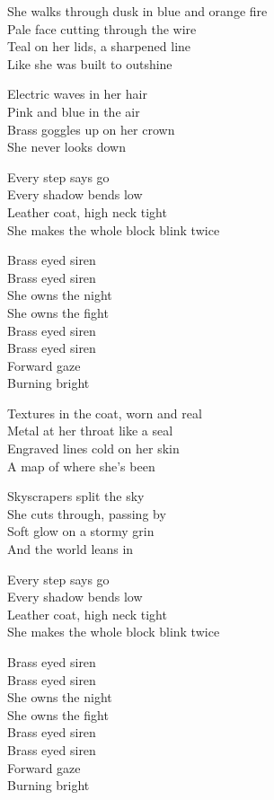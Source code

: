 \begin{lyrics}
She walks through dusk in blue and orange fire\\
Pale face cutting through the wire\\
Teal on her lids, a sharpened line\\
Like she was built to outshine

Electric waves in her hair\\
Pink and blue in the air\\
Brass goggles up on her crown\\
She never looks down

Every step says go\\
Every shadow bends low\\
Leather coat, high neck tight\\
She makes the whole block blink twice

Brass eyed siren\\
Brass eyed siren\\
She owns the night\\
She owns the fight\\
Brass eyed siren\\
Brass eyed siren\\
Forward gaze\\
Burning bright

Textures in the coat, worn and real\\
Metal at her throat like a seal\\
Engraved lines cold on her skin\\
A map of where she's been

Skyscrapers split the sky\\
She cuts through, passing by\\
Soft glow on a stormy grin\\
And the world leans in

Every step says go\\
Every shadow bends low\\
Leather coat, high neck tight\\
She makes the whole block blink twice

Brass eyed siren\\
Brass eyed siren\\
She owns the night\\
She owns the fight\\
Brass eyed siren\\
Brass eyed siren\\
Forward gaze\\
Burning bright


\end{lyrics}
